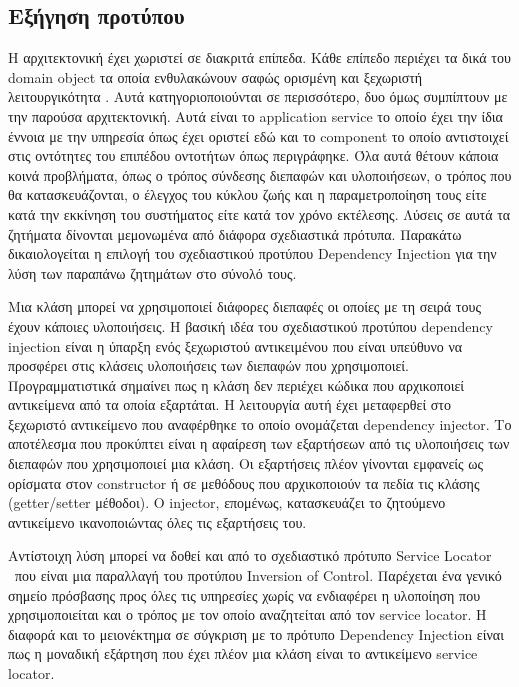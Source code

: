 \subsection{Εξήγηση προτύπου}

Η αρχιτεκτονική έχει χωριστεί σε διακριτά επίπεδα. Κάθε επίπεδο περιέχει 
τα δικά του domain object τα οποία ενθυλακώνουν σαφώς ορισμένη και 
ξεχωριστή λειτουργικότητα \citep{POSA4}. Αυτά κατηγοριοποιούνται 
σε περισσότερο, δυο όμως συμπίπτουν με την παρούσα αρχιτεκτονική. Αυτά 
είναι το application service το οποίο έχει την ίδια έννοια με την 
υπηρεσία όπως έχει οριστεί εδώ και το component το οποίο αντιστοιχεί 
στις οντότητες του επιπέδου οντοτήτων όπως περιγράφηκε. Όλα αυτά θέτουν 
κάποια κοινά προβλήματα, όπως ο τρόπος σύνδεσης διεπαφών και 
υλοποιήσεων, ο τρόπος που θα κατασκευάζονται, ο έλεγχος του κύκλου ζωής 
και η παραμετροποίηση τους είτε κατά την εκκίνηση του συστήματος είτε 
κατά τον χρόνο εκτέλεσης. Λύσεις σε αυτά τα ζητήματα δίνονται μεμονωμένα 
από διάφορα σχεδιαστικά πρότυπα. Παρακάτω δικαιολογείται η επιλογή του 
σχεδιαστικού προτύπου Dependency Injection \citep{Fowler2004} για την λύση 
των παραπάνω ζητημάτων στο σύνολό τους.

Μια κλάση μπορεί να χρησιμοποιεί διάφορες διεπαφές οι οποίες με τη σειρά 
τους έχουν κάποιες υλοποιήσεις. Η βασική ιδέα του σχεδιαστικού προτύπου 
dependency injection είναι η ύπαρξη ενός ξεχωριστού αντικειμένου που 
είναι υπεύθυνο να προσφέρει στις κλάσεις υλοποιήσεις των διεπαφών που 
χρησιμοποιεί. Προγραμματιστικά σημαίνει πως η κλάση δεν περιέχει κώδικα 
που αρχικοποιεί αντικείμενα από τα οποία εξαρτάται. Η λειτουργία αυτή 
έχει μεταφερθεί στο ξεχωριστό αντικείμενο που αναφέρθηκε το οποίο 
ονομάζεται dependency injector. Το αποτέλεσμα που προκύπτει είναι η 
αφαίρεση των εξαρτήσεων από τις υλοποιήσεις των διεπαφών που 
χρησιμοποιεί μια κλάση. Οι εξαρτήσεις πλέον γίνονται εμφανείς ως 
ορίσματα στον constructor ή σε μεθόδους που αρχικοποιούν τα πεδία τις 
κλάσης (getter/setter μέθοδοι). Ο injector, επομένως, κατασκευάζει το 
ζητούμενο αντικείμενο ικανοποιώντας όλες τις εξαρτήσεις του.

Αντίστοιχη λύση μπορεί να δοθεί και από το σχεδιαστικό πρότυπο Service 
Locator \citep{dan2003core} που είναι μια παραλλαγή του 
προτύπου Inversion of Control. Παρέχεται ένα γενικό σημείο πρόσβασης 
προς όλες τις υπηρεσίες χωρίς να ενδιαφέρει η υλοποίηση που 
χρησιμοποιείται και ο τρόπος με τον οποίο αναζητείται από τον service 
locator. Η διαφορά και το μειονέκτημα σε σύγκριση με το πρότυπο 
Dependency Injection είναι πως η μοναδική εξάρτηση που έχει πλέον μια 
κλάση είναι το αντικείμενο service locator.

